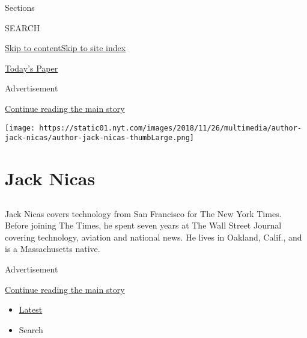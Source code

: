 Sections

SEARCH

\protect\hyperlink{site-content}{Skip to
content}\protect\hyperlink{site-index}{Skip to site index}

\href{https://myaccount.nytimes.com/auth/login?response_type=cookie\&client_id=vi}{}

\href{https://www.nytimes.com/section/todayspaper}{Today's Paper}

Advertisement

\protect\hyperlink{after-top}{Continue reading the main story}

\texttt{[image: https://static01.nyt.com/images/2018/11/26/multimedia/author-jack-nicas/author-jack-nicas-thumbLarge.png]}

\hypertarget{jack-nicas}{%
\section{Jack Nicas}\label{jack-nicas}}

\subsection{}

Jack Nicas covers technology from San Francisco for The New York Times.
Before joining The Times, he spent seven years at The Wall Street
Journal covering technology, aviation and national news. He lives in
Oakland, Calif., and is a Massachusetts native.

Advertisement

\protect\hyperlink{after-mid1}{Continue reading the main story}

\begin{itemize}
\tightlist
\item
  \protect\hyperlink{stream-panel}{Latest}
\item
  Search
\end{itemize}

